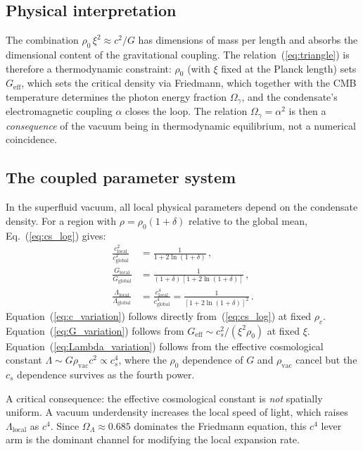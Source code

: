 \documentclass[12pt, a4paper]{article}
\newcommand{\Geff}{G_{\mathrm{eff}}}
\begin{document}
\subsection{Physical interpretation}

The combination $\rho_0\,\xi^2 \approx c^2/G$ has dimensions of mass per length and absorbs the dimensional content of the gravitational coupling. The relation~(\ref{eq:triangle}) is therefore a thermodynamic constraint: $\rho_0$ (with $\xi$ fixed at the Planck length) sets $\Geff$, which sets the critical density via Friedmann, which together with the CMB temperature determines the photon energy fraction $\Omega_\gamma$, and the condensate's electromagnetic coupling $\alpha$ closes the loop. The relation $\Omega_\gamma = \alpha^2$ is then a \emph{consequence} of the vacuum being in thermodynamic equilibrium, not a numerical coincidence.

\subsection{The coupled parameter system}
\label{sec:coupled}

In the superfluid vacuum, all local physical parameters depend on the condensate density. For a region with $\rho = \rho_0(1+\delta)$ relative to the global mean, Eq.~(\ref{eq:cs_log}) gives:
\begin{align}
    \frac{c_{\mathrm{local}}^2}{c_{\mathrm{global}}^2} &= \frac{1}{1 + 2\ln(1+\delta)}\,,
\label{eq:c_variation}\\[6pt]
    \frac{G_{\mathrm{local}}}{G_{\mathrm{global}}} &= \frac{1}{(1+\delta)\,[1 + 2\ln(1+\delta)]}\,,
\label{eq:G_variation}\\[6pt]
    \frac{\Lambda_{\mathrm{local}}}{\Lambda_{\mathrm{global}}} &= \frac{c_{\mathrm{local}}^4}{c_{\mathrm{global}}^4} = \frac{1}{[1 + 2\ln(1+\delta)]^2}\,.
\label{eq:Lambda_variation}
\end{align}
Equation~(\ref{eq:c_variation}) follows directly from~(\ref{eq:cs_log}) at fixed $\rho_c$. Equation~(\ref{eq:G_variation}) follows from $\Geff \sim c_s^2/(\xi^2 \rho_0)$ at fixed $\xi$. Equation~(\ref{eq:Lambda_variation}) follows from the effective cosmological constant $\Lambda \sim G\rho_{\mathrm{vac}}c^2 \propto c_s^4$, where the $\rho_0$ dependence of $G$ and $\rho_{\mathrm{vac}}$ cancel but the $c_s$ dependence survives as the fourth power.

A critical consequence: the effective cosmological constant is \emph{not} spatially uniform. A vacuum underdensity increases the local speed of light, which raises $\Lambda_{\mathrm{local}}$ as $c^4$. Since $\Omega_\Lambda \approx 0.685$ dominates the Friedmann equation, this $c^4$ lever arm is the dominant channel for modifying the local expansion rate.
\end{document}
